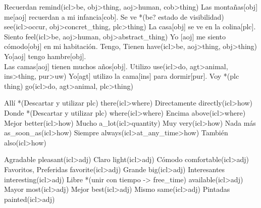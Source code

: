 \documentclass{article}
\begin{document}
{    \uw
    {Recuerdan}
    {remind(icl>be, obj>thing, aoj>human, cob>thing)}
    {Las montañas[obj] me[aoj] recuerdan a mi infancia[cob].}
    \uw
    {Se ve *(be? estado de visibilidad)}
    {see(icl>occur, obj>concret\_thing, plc>thing)}
    {La casa[obj] se ve en la colina[plc].}
    \uw
    {Siento}
    {feel(icl>be, aoj>human, obj>abstract\_thing)}
    {Yo [aoj] me siento cómodo[obj] en mi habitación.}
    \uw
    {Tengo, Tienen}
    {have(icl>be, aoj>thing, obj>thing)}
    {Yo[aoj] tengo hambre[obj].\\
    Las camas[aoj] tienen muchos años[obj].}
    \uw
    {Utilizo}
    {use(icl>do, agt>animal, ins>thing, pur>uw)}
    {Yo[agt] utilizo la cama[ins] para dormir[pur].}
    \uw
    {Voy *(plc thing)}
    {go(icl>do, agt>animal, plc>thing)}
    {}
}

{
    \uw
    {Allí *(Descartar y utilizar plc)}
    {there(icl>where)}
    {}
    \uw
    {Directamente}
    {directly(icl>how)}
    {}
    \uw
    {Donde *(Descartar y utilizar plc)}
    {where(icl>where)}
    {}
    \uw
    {Encima}
    {above(icl>where)}
    {}
    \uw
    {Mejor}
    {better(icl>how)}
    {}
    \uw
    {Mucho}
    {a\_lot(icl>quantity)}
    {}
    \uw
    {Muy}
    {very(icl>how)}
    {}
    \uw
    {Nada más}
    {as\_soon\_as(icl>how)}
    {}
    \uw
    {Siempre}
    {always(icl>at\_any\_time>how)}
    {}
    \uw
    {También}
    {also(icl>how)}
    {}
}

{
    \uw
    {Agradable}
    {pleasant(icl>adj)}
    {}
    \uw
    {Claro}
    {light(icl>adj)}
    {}
    \uw
    {Cómodo}
    {comfortable(icl>adj)}
    {}
    \uw
    {Favoritos, Preferidas}
    {favorite(icl>adj)}
    {}
    \uw
    {Grande}
    {big(icl>adj)}
    {}
    \uw
    {Interesantes}
    {interesting(icl>adj)}
    {}
    \uw
    {Libre *(unir con tiempo -> free\_time)}
    {available(icl>adj)}
    {}
    \uw
    {Mayor}
    {most(icl>adj)}
    {}
    \uw
    {Mejor}
    {best(icl>adj)}
    {}
    \uw
    {Mismo}
    {same(icl>adj)}
    {}
    \uw
    {Pintadas}
    {painted(icl>adj)}
    {}
}
\end{document}
